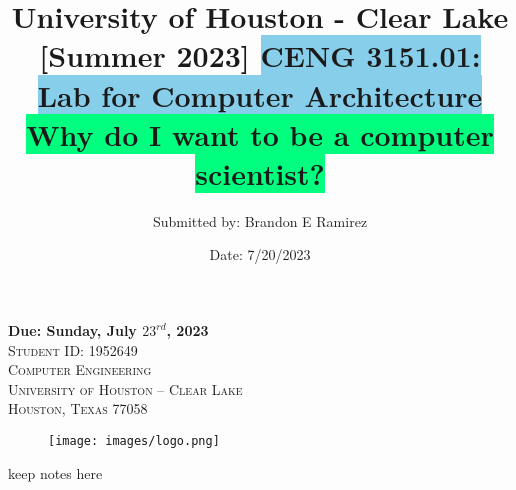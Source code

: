 \documentclass[notitlepage,a4paper,oneside,article,table]{article}
\title {University of Houston - Clear Lake [Summer 2023] \vspace{0.005cm}
\colorbox{SkyBlue}{CENG 3151.01: Lab for Computer Architecture} \\ \vspace{0.65cm}
\colorbox{SpringGreen}{Why do I want to be a computer scientist?}}
\author{Submitted by: Brandon E Ramirez}
\date{Date: 7/20/2023}
\begin{document}
\pagestyle{fancy}

\fancyhead{}\fancyfoot{}





\maketitle

\begin{center}
       \textbf{Due: Sunday, July $23^{rd}$, 2023}\\
       \textsc{Student ID: 1952649}
       \vspace{0.2cm}\\
       
       \textsc{Computer Engineering\\
University of Houston – Clear Lake\\
Houston, Texas 77058}\\


\begin{figure}[h] %
    \centering
    \texttt{[image: images/logo.png]}
\end{figure}
\FloatBarrier
   \end{center}
\doublespacing

       \newpage %


\vspace{1cm}




\iffalse
keep notes here
\end{document}
